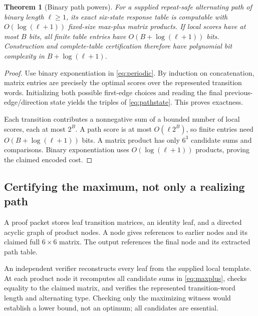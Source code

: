 \documentclass[11pt,letterpaper]{article}
\newtheorem{theorem}{Theorem}[section]
\theoremstyle{definition}
\theoremstyle{remark}
\begin{document}
\begin{theorem}[Binary path powers]
\label{thm:powers}
For a supplied repeat-safe alternating path of binary length $\ell\ge1$, its exact six-state response table is computable with $O(\log(\ell+1))$ fixed-size max-plus matrix products. If local scores have at most $B$ bits, all finite table entries have $O(B+\log(\ell+1))$ bits. Construction and complete-table certification therefore have polynomial bit complexity in $B+\log(\ell+1)$.
\end{theorem}
\begin{proof}
Use binary exponentiation in \cref{eq:periodic}. By induction on concatenation, matrix entries are precisely the optimal scores over the represented transition words. Initializing both possible first-edge choices and reading the final previous-edge/direction state yields the triples of \cref{eq:pathstate}. This proves exactness.

Each transition contributes a nonnegative sum of a bounded number of local scores, each at most $2^B$. A path score is at most $O(\ell 2^B)$, so finite entries need $O(B+\log(\ell+1))$ bits. A matrix product has only $6^3$ candidate sums and comparisons. Binary exponentiation uses $O(\log(\ell+1))$ products, proving the claimed encoded cost.
\end{proof}

\subsection{Certifying the maximum, not only a realizing path}
A proof packet stores leaf transition matrices, an identity leaf, and a directed acyclic graph of product nodes. A node gives references to earlier nodes and its claimed full $6\times6$ matrix. The output references the final node and its extracted path table.

An independent verifier reconstructs every leaf from the supplied local template. At each product node it recomputes all candidate sums in \cref{eq:maxplus}, checks equality to the claimed matrix, and verifies the represented transition-word length and alternating type. Checking only the maximizing witness would establish a lower bound, not an optimum; all candidates are essential.
\end{document}
